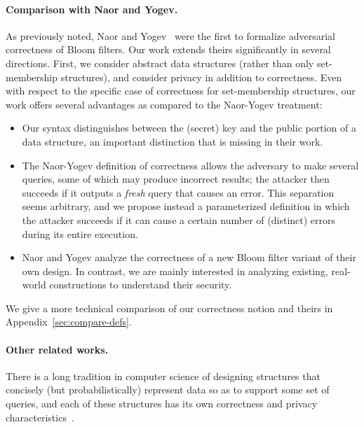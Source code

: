 \paragraph{Comparison with Naor and Yogev.}
As previously noted, Naor and Yogev~\cite{naor2015bloom} were the first to
formalize adversarial correctness of Bloom filters.  Our work extends theirs
significantly in several directions. First, we consider abstract data structures
(rather than only set-membership structures), and consider privacy in addition
to correctness. Even with respect to the specific case of correctness for
set-membership structures, our work offers several advantages as compared
to the Naor-Yogev treatment:
\begin{itemize}
  \item Our syntax distinguishes between the (secret) key and the public portion
    of a data structure, an important distinction that is missing in their work.

  \item The Naor-Yogev definition of correctness allows the
      adversary to make several queries, some of which may
      produce incorrect results; the attacker then succeeds
      if it outputs a \emph{fresh} query that causes an
      error. This separation seems arbitrary, and we
      propose instead a parameterized definition in which
      the attacker succeeds if it can cause a certain
      number of (distinct) errors during its entire
      execution.

  \item Naor and Yogev analyze the correctness of a new Bloom filter variant of
    their own design. In contrast, we are mainly interested in analyzing
    existing, real-world constructions to understand their security.
      \fi
\end{itemize}
We give a more technical comparison of our correctness notion
and theirs in Appendix~\ref{sec:compare-defs}.

\paragraph{Other related works.}
There is a long tradition in computer science of designing structures that
concisely (but probabilistically) represent data so as to support some set of
queries, and each of these structures has its own correctness and privacy
characteristics~\cite{chazelle2004bloomier,cormode2005improved,DP08a,DF03,fredman1984storing,mironov2011sketching}.

